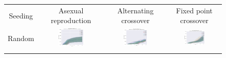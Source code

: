 \documentclass{article}
\begin{document}
\begin{landscape}
\begin{figure}[t]
\begin{center}
\begin{tabular}{c c c c}
    Seeding & Asexual reproduction & Alternating crossover & Fixed point crossover \\
    Random & \includegraphics[align=c,width=0.42\textwidth]{cc/e3/1} & \includegraphics[align=c,width=0.42\textwidth]{cc/e3/2} & \includegraphics[align=c,width=0.42\textwidth]{cc/e3/3} \\
    & & & \\

\end{tabular}
\end{center}
\end{figure}
\end{landscape}
\end{document}
